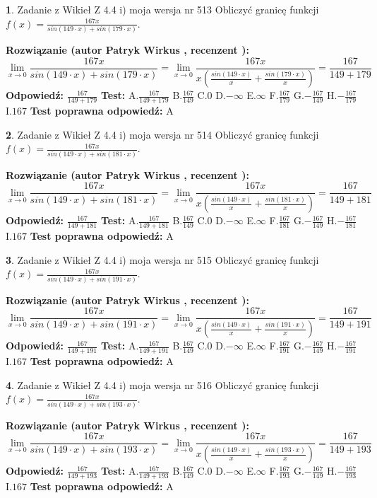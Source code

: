 \documentclass[12pt, a4paper]{article}
\theoremstyle{definition} %
\newtheorem{zad}{}
\newcommand{\zadStart}[1]{\begin{zad}#1\newline}
\newcommand{\zadStop}{\end{zad}}
\newcommand{\rozwStart}[2]{\noindent \textbf{Rozwiązanie (autor #1 , recenzent #2): }\newline}
\newcommand{\rozwStop}{\newline}
\newcommand{\odpStart}{\noindent \textbf{Odpowiedź:}\newline}
\newcommand{\odpStop}{\newline}
\newcommand{\testStart}{\noindent \textbf{Test:}\newline}
\newcommand{\testStop}{\newline}
\newcommand{\kluczStart}{\noindent \textbf{Test poprawna odpowiedź:}\newline}
\newcommand{\kluczStop}{\newline}
\begin{document}
\zadStart{Zadanie z Wikieł Z 4.4 i) moja wersja nr 513}
Obliczyć granicę funkcji $f(x)=\frac{167x}{sin(149\cdot x) +sin(179\cdot x)}$.
\zadStop
\rozwStart{Patryk Wirkus}{}
$$\lim\limits_{x\to 0}\frac{167x}{sin(149\cdot x) +sin(179\cdot x)}=\lim\limits_{x\to 0}\frac{167x}{x(\frac{sin(149\cdot x)}{x}+\frac{sin(179\cdot x)}{x})}=\frac{167}{149+179}$$
\rozwStop
\odpStart
$\frac{167}{149+179}$
\odpStop
\testStart
A.$\frac{167}{149+179}$
B.$\frac{167}{149}$
C.$0$
D.$-\infty$
E.$\infty$
F.$\frac{167}{179}$
G.$-\frac{167}{149}$
H.$-\frac{167}{179}$
I.$167$
\testStop
\kluczStart
A
\kluczStop



\zadStart{Zadanie z Wikieł Z 4.4 i) moja wersja nr 514}
Obliczyć granicę funkcji $f(x)=\frac{167x}{sin(149\cdot x) +sin(181\cdot x)}$.
\zadStop
\rozwStart{Patryk Wirkus}{}
$$\lim\limits_{x\to 0}\frac{167x}{sin(149\cdot x) +sin(181\cdot x)}=\lim\limits_{x\to 0}\frac{167x}{x(\frac{sin(149\cdot x)}{x}+\frac{sin(181\cdot x)}{x})}=\frac{167}{149+181}$$
\rozwStop
\odpStart
$\frac{167}{149+181}$
\odpStop
\testStart
A.$\frac{167}{149+181}$
B.$\frac{167}{149}$
C.$0$
D.$-\infty$
E.$\infty$
F.$\frac{167}{181}$
G.$-\frac{167}{149}$
H.$-\frac{167}{181}$
I.$167$
\testStop
\kluczStart
A
\kluczStop



\zadStart{Zadanie z Wikieł Z 4.4 i) moja wersja nr 515}
Obliczyć granicę funkcji $f(x)=\frac{167x}{sin(149\cdot x) +sin(191\cdot x)}$.
\zadStop
\rozwStart{Patryk Wirkus}{}
$$\lim\limits_{x\to 0}\frac{167x}{sin(149\cdot x) +sin(191\cdot x)}=\lim\limits_{x\to 0}\frac{167x}{x(\frac{sin(149\cdot x)}{x}+\frac{sin(191\cdot x)}{x})}=\frac{167}{149+191}$$
\rozwStop
\odpStart
$\frac{167}{149+191}$
\odpStop
\testStart
A.$\frac{167}{149+191}$
B.$\frac{167}{149}$
C.$0$
D.$-\infty$
E.$\infty$
F.$\frac{167}{191}$
G.$-\frac{167}{149}$
H.$-\frac{167}{191}$
I.$167$
\testStop
\kluczStart
A
\kluczStop



\zadStart{Zadanie z Wikieł Z 4.4 i) moja wersja nr 516}
Obliczyć granicę funkcji $f(x)=\frac{167x}{sin(149\cdot x) +sin(193\cdot x)}$.
\zadStop
\rozwStart{Patryk Wirkus}{}
$$\lim\limits_{x\to 0}\frac{167x}{sin(149\cdot x) +sin(193\cdot x)}=\lim\limits_{x\to 0}\frac{167x}{x(\frac{sin(149\cdot x)}{x}+\frac{sin(193\cdot x)}{x})}=\frac{167}{149+193}$$
\rozwStop
\odpStart
$\frac{167}{149+193}$
\odpStop
\testStart
A.$\frac{167}{149+193}$
B.$\frac{167}{149}$
C.$0$
D.$-\infty$
E.$\infty$
F.$\frac{167}{193}$
G.$-\frac{167}{149}$
H.$-\frac{167}{193}$
I.$167$
\testStop
\kluczStart
A
\kluczStop
\end{document}
